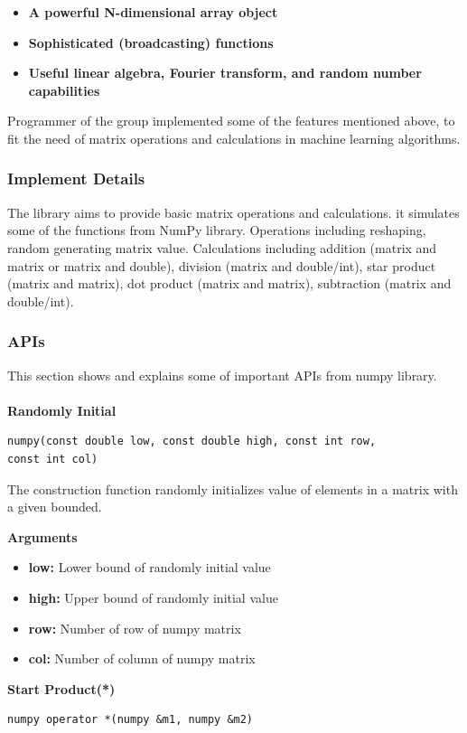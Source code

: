 \documentclass[letterpaper]{article}
\begin{document}
\begin{itemize}
	\item{\textbf{A powerful N-dimensional array object}}
    \item{\textbf{Sophisticated (broadcasting) functions} }
    \item{\textbf{Useful linear algebra, Fourier transform, and random number capabilities} }
\end{itemize}

Programmer of the group implemented some of the features mentioned above, to fit the need of matrix operations and calculations in machine learning algorithms.    


\subsubsection{Implement Details}
The library aims to provide basic matrix operations and calculations. it simulates some of the functions from NumPy library. Operations including reshaping, random generating matrix value. Calculations including addition (matrix and matrix or matrix and double), division (matrix and double/int), star product (matrix and matrix), dot product (matrix and matrix), subtraction (matrix and double/int).

\subsubsection{APIs}                                                                    
This section shows and explains some of important APIs from numpy library.\\\\
\textbf{\Large Randomly Initial}\\           
\begin{lstlisting}[language={[ANSI]C++},keywordstyle=\color{blue!70},commentstyle=\color{red!50!green!50!blue!50},frame=shadowbox, rulesepcolor=\color{red!20!green!20!blue!20}]
numpy(const double low, const double high, const int row, 
const int col)
\end{lstlisting}

The construction function randomly initializes value of elements in a matrix with a given bounded.

\textbf{Arguments}
\begin{itemize}
	\item{\textbf{low:} Lower bound of randomly initial value}
    \item{\textbf{high:} Upper bound of randomly initial value}
    \item{\textbf{row:} Number of row of numpy matrix}
    \item{\textbf{col:} Number of column of numpy matrix}
\end{itemize}
\textbf{\Large Start Product(*)}\\
\begin{lstlisting}[language={[ANSI]C++},keywordstyle=\color{blue!70},commentstyle=\color{red!50!green!50!blue!50},frame=shadowbox, rulesepcolor=\color{red!20!green!20!blue!20}]
numpy operator *(numpy &m1, numpy &m2)
\end{lstlisting}
\end{document}
